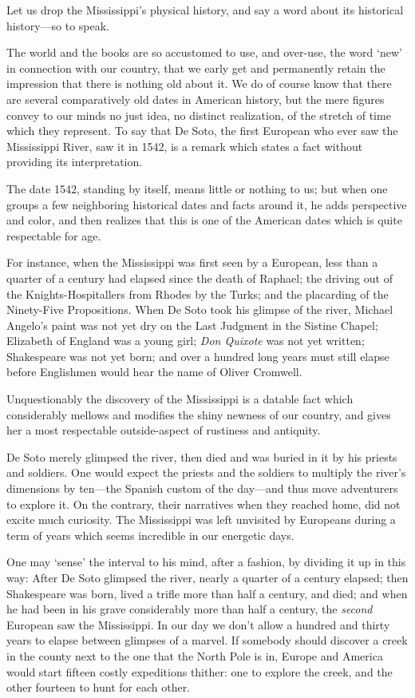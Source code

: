 \documentclass[../demo.tex]{novelette-subdoc}
\begin{document}

Let us drop the Mississippi's physical history, and say a word about its
historical history---so to speak.

The world and the books are so accustomed to use, and over-use, the word
`new' in connection with our country, that we early get and permanently
retain the impression that there is nothing old about it. We do of
course know that there are several comparatively old dates in American
history, but the mere figures convey to our minds no just idea, no
distinct realization, of the stretch of time which they represent.
To say that De Soto, the first European who ever saw the Mississippi
River, saw it in 1542, is a remark which states a fact without
providing its interpretation.

The date 1542, standing by itself, means little or nothing to us; but
when one groups a few neighboring historical dates and facts around it,
he adds perspective and color, and then realizes that this is one of the
American dates which is quite respectable for age.

For instance, when the Mississippi was first seen by a European, less
than a quarter of a century had elapsed since the death of Raphael;
the driving out of the Knights-Hospitallers from Rhodes by
the Turks; and the placarding of the Ninety-Five Propositions.
When De Soto took his glimpse of the river,
Michael Angelo's paint was not yet dry on the Last
Judgment in the Sistine Chapel; Elizabeth of England was
a young girl; \textit{Don Quixote} was not yet written;
Shakespeare was not yet born; and over a hundred long years must
still elapse before Englishmen would hear the name of Oliver Cromwell.

Unquestionably the discovery of the Mississippi is a datable fact which
considerably mellows and modifies the shiny newness of our country, and
gives her a most respectable outside-aspect of rustiness and antiquity.

De Soto merely glimpsed the river, then died and was buried in it by his
priests and soldiers. One would expect the priests and the soldiers
to multiply the river's dimensions by ten---the Spanish custom of the
day---and thus move adventurers to explore it. On the contrary, their
narratives when they reached home, did not excite much curiosity.
The Mississippi was left unvisited by Europeans during a term of years which
seems incredible in our energetic days.

One may `sense' the interval to his mind, after a fashion, by dividing it
up in this way: After De Soto glimpsed the river, nearly
a quarter of a century elapsed; then Shakespeare was born,
lived a trifle more than half a century, and died; and when he had been in
his grave considerably more than half a century, the \textit{second} European
saw the Mississippi. In our day we don't allow a hundred and thirty years to
elapse between glimpses of a marvel. If somebody should discover a creek
in the county next to the one that the North Pole is in, Europe and
America would start fifteen costly expeditions thither: one to explore
the creek, and the other fourteen to hunt for each other.
\end{document}
